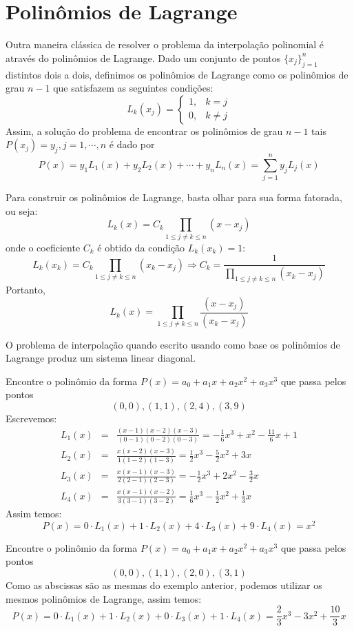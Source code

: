 \documentclass[main.tex]{subfiles}
\begin{document}
\section{Polinômios de Lagrange}
Outra maneira clássica de resolver o problema da interpolação polinomial é através do polinômios de Lagrange. Dado um conjunto de pontos $\{x_j\}_{j=1}^n$ distintos dois a dois, definimos os polinômios de Lagrange como os polinômios de grau $n-1$ que satisfazem as seguintes condições:
$$
L_k(x_j)=\left\{\begin{array}{rl}
1,&k=j\\
0,&k\neq j
\end{array}
\right.
$$
Assim, a solução do problema de encontrar os polinômios de grau $n-1$ tais $P(x_j)=y_j,j=1,\cdots,n$ é dado por
$$P(x)=y_1L_1(x)+y_2L_2(x)+\cdots +y_nL_n(x)=\sum_{j=1}^n y_j L_j(x)$$

Para construir os polinômios de Lagrange, basta olhar para sua forma fatorada, ou seja:
$$L_k(x)=C_k\prod_{1\leq j \neq k \leq n } (x-x_j)$$
onde o coeficiente $C_k$ é obtido da condição $L_k(x_k)=1$:
$$L_k(x_k)=C_k\prod_{1\leq j \neq k \leq n } (x_k-x_j) \Longrightarrow C_k=\frac{1}{\prod_{1\leq j \neq k \leq n } (x_k-x_j)}$$
Portanto,
$$L_k(x)=\prod_{1\leq j \neq k \leq n } \frac{(x-x_j)}{(x_k-x_j)}$$

\begin{obs} O problema de interpolação quando escrito usando como base os polinômios de Lagrange produz um sistema linear diagonal.
\end{obs}

\begin{ex}Encontre o polinômio da forma $P(x)=a_0+a_1x+a_2x^2+a_3x^3$ que passa pelos pontos
$$(0,0),(1,1),(2,4),(3,9)$$
Escrevemos:
\begin{eqnarray*}
L_1(x)&=& \frac{(x-1)(x-2)(x-3)}{(0-1)(0-2)(0-3)}=-\frac{1}{6}x^3+x^2-\frac{11}{6}x+1\\
L_2(x)&=& \frac{x(x-2)(x-3)}{1(1-2)(1-3)}=\frac{1}{2}x^3-\frac{5}{2}x^2+3x\\
L_3(x)&=& \frac{x(x-1)(x-3)}{2(2-1)(2-3)}=-\frac{1}{2}x^3+2x^2-\frac{3}{2}x\\
L_4(x)&=& \frac{x(x-1)(x-2)}{3(3-1)(3-2)}=\frac{1}{6}x^3-\frac{1}{2}x^2+\frac{1}{3}x
\end{eqnarray*}
Assim temos:
$$P(x)=0\cdot L_1(x)+1\cdot L_2(x)+4\cdot L_3(x)+9\cdot L_4(x)=x^2$$
\end{ex}

\begin{ex}Encontre o polinômio da forma $P(x)=a_0+a_1x+a_2x^2+a_3x^3$ que passa pelos pontos
$$(0,0),(1,1),(2,0),(3,1)$$
Como as abscissas são as mesmas do exemplo anterior, podemos utilizar os mesmos polinômios de Lagrange, assim temos:
$$P(x)=0\cdot L_1(x)+1\cdot L_2(x)+0\cdot L_3(x)+1\cdot L_4(x)=\frac{2}{3}x^3-3x^2+\frac{10}{3}x$$
\end{ex}
\end{document}
